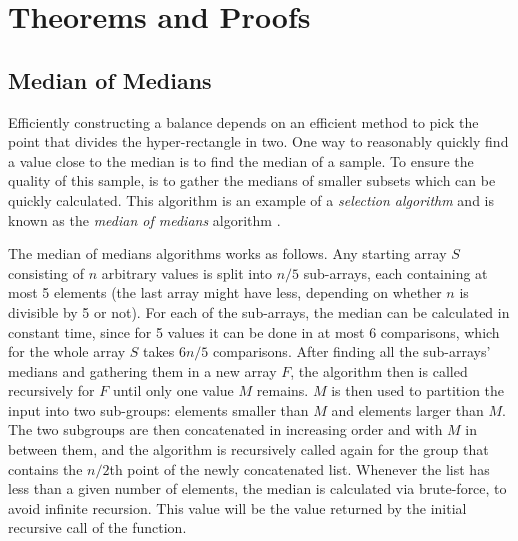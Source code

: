 \appendix
\chapter{Theorems and Proofs}
\label{chap:append}


\section{Median of Medians}
\label{ann:median}
Efficiently constructing a balance \kdtree depends on an efficient method to pick the point that divides the hyper-rectangle in two. One way to reasonably quickly find a value close to the median is to find the median of a sample. To ensure the quality of this sample, is to gather the medians of smaller subsets which can be quickly calculated. This algorithm is an example of a \emph{selection algorithm} \cite{selection} and is known as the \emph{median of medians} algorithm \cite{medians}.

The median of medians algorithms works as follows. Any starting array $S$ consisting of $n$ arbitrary values is split into $n/5$ sub-arrays, each containing at most 5 elements (the last array might have less, depending on whether $n$ is divisible by 5 or not). For each of the sub-arrays, the median can be calculated in constant time, since for 5 values it can be done in at most 6 comparisons, which for the whole array $S$ takes $6n/5$ comparisons. After finding all the sub-arrays' medians and gathering them in a new array $F$, the algorithm then is called recursively for $F$ until only one value $M$ remains. $M$ is then used to partition the input into two sub-groups: elements smaller than $M$ and elements larger than $M$. The two subgroups are then concatenated in increasing order and with $M$ in between them, and the algorithm is recursively called again for the group that contains the $n/2$th point of the newly concatenated list. Whenever the list has less than a given number of elements, the median is calculated via brute-force, to avoid infinite recursion. This value will be the value returned by the initial recursive call of the function.

